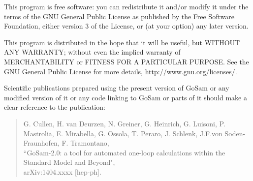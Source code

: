 \documentclass[11pt,a4paper]{refrep}
\begin{document}
    This program is free software: you can redistribute it and/or modify
    it under the terms of the GNU General Public License as published by
    the Free Software Foundation, either version 3 of the License, or
    (at your option) any later version.

    This program is distributed in the hope that it will be useful,
    but WITHOUT ANY WARRANTY; without even the implied warranty of
    MERCHANTABILITY or FITNESS FOR A PARTICULAR PURPOSE.  See the
    GNU General Public License for more details, 
    \url{http://www.gnu.org/licenses/}.

   
    Scientific publications prepared using the present version of
    GoSam or any modified version of it or any code linking to
    GoSam or parts of it should make a clear reference to the publication:

    \begin{quote}
        G. Cullen,  H. van Deurzen, N. Greiner, G. Heinrich, G. Luisoni, 
              P. Mastrolia, E. Mirabella, G. Ossola, T. Peraro, J. Schlenk, 
	      J.F.von Soden-Fraunhofen, F. Tramontano, \\
	``GoSam-2.0: a tool for automated one-loop calculations within the Standard Model and Beyond",\\
	arXiv:1404.xxxx [hep-ph].
    \end{quote}





\begin{fullpage}

\end{fullpage}

\clearpage
\remarks
\end{document}
